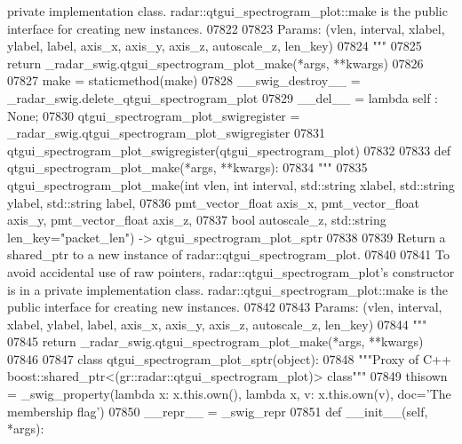 \begin{DoxyCode}
{{{{{{{{{{{{{{{{{{{{{{{{{{{       private implementation class. radar::qtgui\_spectrogram\_plot::make is the public interface for creating new
       instances.}
07822 \textcolor{stringliteral}{}
07823 \textcolor{stringliteral}{        Params: (vlen, interval, xlabel, ylabel, label, axis\_x, axis\_y, axis\_z, autoscale\_z, len\_key)}
07824 \textcolor{stringliteral}{        """}
07825         \textcolor{keywordflow}{return} \_radar\_swig.qtgui\_spectrogram\_plot\_make(*args, **kwargs)
07826 
07827     make = staticmethod(make)
07828     \_\_swig\_destroy\_\_ = \_radar\_swig.delete\_qtgui\_spectrogram\_plot
07829     \_\_del\_\_ = \textcolor{keyword}{lambda} self : \textcolor{keywordtype}{None};
07830 qtgui\_spectrogram\_plot\_swigregister = \_radar\_swig.qtgui\_spectrogram\_plot\_swigregister
07831 qtgui_spectrogram_plot_swigregister(qtgui\_spectrogram\_plot)
07832 
07833 \textcolor{keyword}{def }qtgui_spectrogram_plot_make(*args, **kwargs):
07834   \textcolor{stringliteral}{"""}
07835 \textcolor{stringliteral}{    qtgui\_spectrogram\_plot\_make(int vlen, int interval, std::string xlabel, std::string ylabel, std::string
       label, }
07836 \textcolor{stringliteral}{        pmt\_vector\_float axis\_x, pmt\_vector\_float axis\_y, pmt\_vector\_float axis\_z, }
07837 \textcolor{stringliteral}{        bool autoscale\_z, std::string len\_key="packet\_len") -> qtgui\_spectrogram\_plot\_sptr}
07838 \textcolor{stringliteral}{}
07839 \textcolor{stringliteral}{    Return a shared\_ptr to a new instance of radar::qtgui\_spectrogram\_plot.}
07840 \textcolor{stringliteral}{}
07841 \textcolor{stringliteral}{    To avoid accidental use of raw pointers, radar::qtgui\_spectrogram\_plot's constructor is in a private
       implementation class. radar::qtgui\_spectrogram\_plot::make is the public interface for creating new instances.}
07842 \textcolor{stringliteral}{}
07843 \textcolor{stringliteral}{    Params: (vlen, interval, xlabel, ylabel, label, axis\_x, axis\_y, axis\_z, autoscale\_z, len\_key)}
07844 \textcolor{stringliteral}{    """}
07845   \textcolor{keywordflow}{return} \_radar\_swig.qtgui\_spectrogram\_plot\_make(*args, **kwargs)
07846 
07847 \textcolor{keyword}{class }qtgui_spectrogram_plot_sptr(object):
07848     \textcolor{stringliteral}{"""Proxy of C++ boost::shared\_ptr<(gr::radar::qtgui\_spectrogram\_plot)> class"""}
07849     thisown = _swig_property(\textcolor{keyword}{lambda} x: x.this.own(), \textcolor{keyword}{lambda} x, v: x.this.own(v), doc=\textcolor{stringliteral}{'The membership flag'})
07850     \_\_repr\_\_ = \_swig\_repr
07851     \textcolor{keyword}{def }__init__(self, *args): 
}}}}}}}}}}}}}}}}}}}}}}}}}}
\end{DoxyCode}
